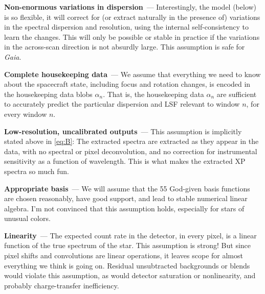 \documentclass[11pt]{article}
\renewcommand{\paragraph}[1]{\medskip\par\noindent\textbf{#1}~---}
\begin{document}
\paragraph{Non-enormous variations in dispersion}
Interestingly, the model (below) is so flexible, it will correct for (or extract naturally in the presence of) variations in the spectral dispersion and resolution, using the internal self-consistency to learn the changes.
This will only be possible or stable in practice if the variations in the across-scan direction is not absurdly large.
This assumption is safe for \textsl{Gaia}.

\paragraph{Complete housekeeping data}
We assume that everything we need to know about the spacecraft state, including focus and rotation changes, is encoded in the housekeeping data blobs $\alpha_n$.
That is, the housekeeping data $\alpha_n$ are sufficient to accurately predict the particular dispersion and LSF relevant to window $n$, for every window $n$.

\paragraph{Low-resolution, uncalibrated outputs}
This assumption is implicitly stated above in \eqref{eq:B}:
The extracted spectra are extracted as they appear in the data, with no spectral or pixel deconvolution, and no correction for instrumental sensitivity as a function of wavelength.
This is what makes the extracted XP spectra so much fun.

\paragraph{Appropriate basis}
We will assume that the 55 God-given basis functions are chosen reasonably, have good support, and lead to stable numerical linear algebra.
I'm not convinced that this assumption holds, especially for stars of unusual colors.

\paragraph{Linearity}
The expected count rate in the detector, in every pixel, is a linear function of the true spectrum of the star.
This assumption is strong!
But since pixel shifts and convolutions are linear operations, it leaves scope for almost everything we think is going on.
Residual unsubtracted backgrounds or blends would violate this assumption, as would detector saturation or nonlinearity, and probably charge-transfer inefficiency.
\end{document}
